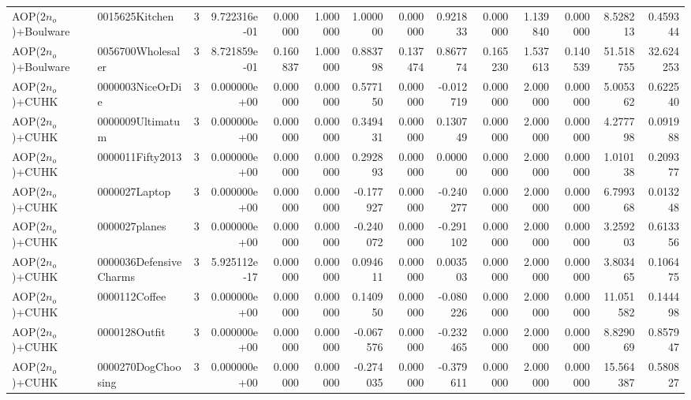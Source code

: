 \begin{tabular}{llrr|r|rr|rr|rr|rrr}
    AOP($2 n_o$)+Boulware &         0015625Kitchen &       3 & 9.722316e-01 & 0.000000 & 1.000000 &      1.000000 & 0.000000 &      0.921833 & 0.000000 &      1.139840 &    0.000000 &     8.528213 &    0.459344 \\
    AOP($2 n_o$)+Boulware &      0056700Wholesaler &       3 & 8.721859e-01 & 0.160837 & 1.000000 &      0.883798 & 0.137474 &      0.867774 & 0.165230 &      1.537613 &    0.140539 &    51.518755 &   32.624253 \\
        AOP($2 n_o$)+CUHK &       0000003NiceOrDie &       3 & 0.000000e+00 & 0.000000 & 0.000000 &      0.577150 & 0.000000 &     -0.012719 & 0.000000 &      2.000000 &    0.000000 &     5.005362 &    0.622540 \\
        AOP($2 n_o$)+CUHK &       0000009Ultimatum &       3 & 0.000000e+00 & 0.000000 & 0.000000 &      0.349431 & 0.000000 &      0.130749 & 0.000000 &      2.000000 &    0.000000 &     4.277798 &    0.091988 \\
        AOP($2 n_o$)+CUHK &       0000011Fifty2013 &       3 & 0.000000e+00 & 0.000000 & 0.000000 &      0.292893 & 0.000000 &      0.000000 & 0.000000 &      2.000000 &    0.000000 &     1.010138 &    0.209377 \\
        AOP($2 n_o$)+CUHK &          0000027Laptop &       3 & 0.000000e+00 & 0.000000 & 0.000000 &     -0.177927 & 0.000000 &     -0.240277 & 0.000000 &      2.000000 &    0.000000 &     6.799368 &    0.013248 \\
        AOP($2 n_o$)+CUHK &          0000027planes &       3 & 0.000000e+00 & 0.000000 & 0.000000 &     -0.240072 & 0.000000 &     -0.291102 & 0.000000 &      2.000000 &    0.000000 &     3.259203 &    0.613356 \\
        AOP($2 n_o$)+CUHK & 0000036DefensiveCharms &       3 & 5.925112e-17 & 0.000000 & 0.000000 &      0.094611 & 0.000000 &      0.003503 & 0.000000 &      2.000000 &    0.000000 &     3.803465 &    0.106475 \\
        AOP($2 n_o$)+CUHK &          0000112Coffee &       3 & 0.000000e+00 & 0.000000 & 0.000000 &      0.140950 & 0.000000 &     -0.080226 & 0.000000 &      2.000000 &    0.000000 &    11.051582 &    0.144498 \\
        AOP($2 n_o$)+CUHK &          0000128Outfit &       3 & 0.000000e+00 & 0.000000 & 0.000000 &     -0.067576 & 0.000000 &     -0.232465 & 0.000000 &      2.000000 &    0.000000 &     8.829069 &    0.857947 \\
        AOP($2 n_o$)+CUHK &     0000270DogChoosing &       3 & 0.000000e+00 & 0.000000 & 0.000000 &     -0.274035 & 0.000000 &     -0.379611 & 0.000000 &      2.000000 &    0.000000 &    15.564387 &    0.580827 \\

\end{tabular}
